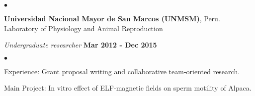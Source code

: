 \documentclass[margin,line]{res}
\newenvironment{list1}{
  \begin{list}{\ding{113}}{%
      \setlength{\itemsep}{0in}
      \setlength{\parsep}{0in} \setlength{\parskip}{0in}
      \setlength{\topsep}{0in} \setlength{\partopsep}{0in}
      \setlength{\leftmargin}{0.17in}}}{\end{list}}
\newenvironment{list2}{
  \begin{list}{$\bullet$}{%
      \setlength{\itemsep}{0in}
      \setlength{\parsep}{0in} \setlength{\parskip}{0in}
      \setlength{\topsep}{0in} \setlength{\partopsep}{0in}
      \setlength{\leftmargin}{0.2in}}}{\end{list}}
\begin{document}
\begin{resume}
\begin{list1}
\begin{list2}
	\end{list2}
\end{list1}

{\bf Universidad Nacional Mayor de San Marcos (UNMSM)}, Peru.\\
Laboratory of Physiology and Animal Reproduction\\
\vspace*{-.1in}
\begin{list1}
	\item[] {\em Undergraduate researcher} \hfill {\bf Mar 2012 - Dec 2015}\\
	\vspace*{-.1in}
	\begin{list2} %
		\item Experience: Grant proposal writing and collaborative team-oriented research. %
		\item Main Project: In vitro effect of ELF-magnetic fields on sperm motility of Alpaca.\\ %
	\end{list2}
\end{list1}


\end{resume}
\end{document}
